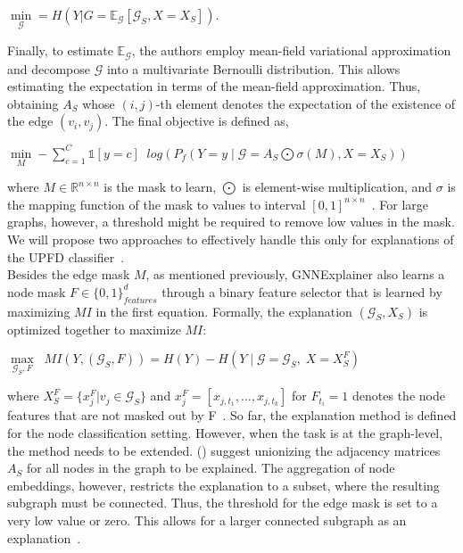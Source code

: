 \begin{center}
    $\min\limits_{\mathcal{G}} = H(Y | G = \mathbb{E}_{\mathcal{G}} [\mathcal{G}_S, X = X_S])$.
\end{center}
Finally, to estimate $\mathbb{E}_{\mathcal{G}}$, the authors employ mean-field variational approximation and decompose $\mathcal{G}$ into a multivariate Bernoulli distribution. This allows estimating the expectation in terms of the mean-field approximation. Thus, obtaining $A_S$ whose $(i, j)$-th element denotes the expectation of the existence of the edge $(v_i, v_j)$. The final objective is defined as,
\begin{center}
    $\min\limits_M - \sum\limits_{c=1}^C \mathbb{1}[y = c] \;\;log(P_f (Y=y \;|\; \mathcal{G} = A_S \bigodot \sigma(M), X = X_S))$
\end{center}
where $M \in \mathbb{R}^{n \times n}$ is the mask to learn, $\bigodot$ is element-wise multiplication, and $\sigma$ is
the mapping function of the mask to values to interval $[0, 1]^{n \times n}$~\parencite{GNNExplainer_Ying}. For large graphs, however, a threshold might be required to remove low values in the mask. We will propose two approaches to effectively
handle this only for explanations of the UPFD classifier~\parencite{GNNExplainer_Ying}.\\
Besides the edge mask $M$, as mentioned previously, GNNExplainer also learns a node mask $F \in \{0, 1\}^d_{features}$ through a binary feature selector that is learned by maximizing $MI$ in the first equation. Formally, the explanation $(\mathcal{G}_S, X_S)$ is optimized together to maximize $MI$:
\begin{center}
    $\max\limits_{\mathcal{G}_S, F} \;\; MI (Y, (\mathcal{G}_S, F)) = H(Y) - H(Y \;|\; \mathcal{G} = \mathcal{G}_S,\; X = X_S^F)$
\end{center}
where $X_S^F = \{x_j^F|v_j \in \mathcal{G}_S\}$ and $x_j^F = [x_{j, t_1}, \dots, x_{j, t_k}]$ for
$F_{t_i} = 1$ denotes the node features that are not masked out by F~\parencite{GNNExplainer_Ying}. So far, the
explanation method is defined for the node classification setting. However, when the task is at the graph-level, the method needs to be extended. \citeauthor{GNNExplainer_Ying} (\citeyear{GNNExplainer_Ying}) suggest unionizing the adjacency matrices $A_S$ for all nodes in the graph to be explained. The aggregation of node embeddings, however, restricts the explanation to a subset, where the resulting subgraph must be connected. Thus, the threshold for the edge mask is set to a very low value or zero. This allows for a larger connected subgraph as an explanation~\parencite{GNNExplainer_Ying}.\\


